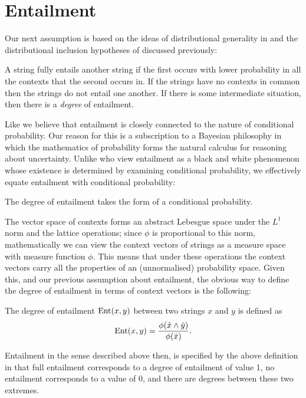 \documentclass[12pt]{report}
\begin{document}


\section{Entailment}



Our next assumption is based on the ideas of distributional generality in \citep{Weeds:04} and the distributional inclusion hypotheses of \cite{Geffet:05} discussed previously:
\begin{assumption} A string fully entails another string if the first occurs with lower probability in all the contexts that the second occurs in. If the strings have no contexts in common then the strings do not entail one another. If there is some intermediate situation, then there is a \emph{degree} of entailment.\end{assumption}\noindent
Like \cite{Glickman:05} we believe that entailment is closely connected to the nature of conditional probability. Our reason for this is a subscription to a Bayesian philosophy in which the mathematics of probability forms the natural calculus for reasoning about uncertainty. Unlike \citeauthor{Glickman:05} who view entailment as a black and white phenomenon whose existence is determined by examining conditional probability, we effectively equate entailment with conditional probability:
\begin{assumption}
The degree of entailment takes the form of a conditional probability.
\end{assumption}
\noindent
The vector space of contexts forms an abstract Lebesgue space under the $L^1$ norm and the lattice operations; since $\phi$ is proportional to this norm, mathematically we can view the context vectors of strings as a measure space with measure function $\phi$. This means that under these operations the context vectors carry all the properties of an (unnormalised) probability space. Given this, and our previous assumption about entailment, the obvious way to define the degree of entailment in terms of context vectors is the following:
\begin{defn}
The degree of entailment $\operatorname{Ent}(x,y)$ between two strings $x$ and $y$ is defined as
$$\operatorname{Ent}(x,y) = \frac{\phi(\hat{x}\land\hat{y})}{\phi(\hat{x})}.$$
\end{defn}
Entailment in the sense described above then, is specified by the above definition in that full entailment corresponds to a degree of entailment of value 1, no entailment corresponds to a value of 0, and there are degrees between these two extremes.
\end{document}
